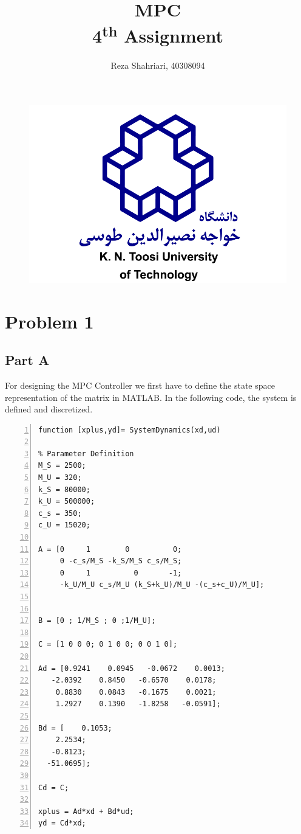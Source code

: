 \documentclass{article}
\begin{document}
\begin{figure}
  \centering
  \includegraphics[scale = 0.4]{images/kn-toosi.png}
\end{figure}


\title{MPC \\
       4\textsuperscript{th} Assignment}

\author{Reza Shahriari, 40308094}

\maketitle

\newpage

\section{Problem 1}
\subsection{Part A}
For designing the MPC Controller we first have to define the state space representation of the matrix in MATLAB. In the following code, the system is defined and discretized.

\begin{lstlisting}[frame=single,numbers=left,style=Matlab-Pyglike]
function [xplus,yd]= SystemDynamics(xd,ud)

% Parameter Definition
M_S = 2500;
M_U = 320;
k_S = 80000;
k_U = 500000;
c_s = 350;
c_U = 15020;

A = [0     1        0          0;
     0 -c_s/M_S -k_S/M_S c_s/M_S;
     0     1          0       -1;
     -k_U/M_U c_s/M_U (k_S+k_U)/M_U -(c_s+c_U)/M_U];


B = [0 ; 1/M_S ; 0 ;1/M_U];

C = [1 0 0 0; 0 1 0 0; 0 0 1 0];

Ad = [0.9241    0.0945   -0.0672    0.0013;
   -2.0392    0.8450   -0.6570    0.0178;
    0.8830    0.0843   -0.1675    0.0021;
    1.2927    0.1390   -1.8258   -0.0591];

Bd = [    0.1053;
    2.2534;
   -0.8123;
  -51.0695];

Cd = C;

xplus = Ad*xd + Bd*ud;
yd = Cd*xd;
\end{lstlisting}
\end{document}

